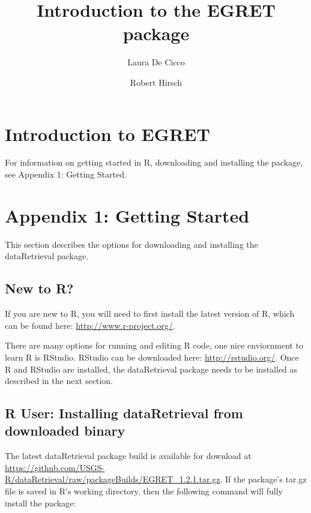 \documentclass[a4paper,11pt]{article}
\begin{document}


\title{Introduction to the EGRET package}
\author[1]{Laura De Cicco}
\author[1]{Robert Hirsch}



\maketitle
\tableofcontents

\section{Introduction to EGRET}

For information on getting started in R, downloading and installing the package, see Appendix 1: Getting Started.




\newpage
\section{Appendix 1: Getting Started}
This section describes the options for downloading and installing the dataRetrieval package.

\subsection{New to R?}
If you are new to R, you will need to first install the latest version of R, which can be found here: \url{http://www.r-project.org/}.

There are many options for running and editing R code, one nice enviornment to learn R is RStudio. RStudio can be downloaded here: \url{http://rstudio.org/}. Once R and RStudio are installed, the dataRetrieval package needs to be installed as described in the next section.

\subsection{R User: Installing dataRetrieval from downloaded binary}
The latest dataRetrieval package build is available for download at \url{https://github.com/USGS-R/dataRetrieval/raw/packageBuilds/EGRET_1.2.1.tar.gz}.  If the package's tar.gz file is saved in R's working directory, then the following command will fully install the package:
\end{document}
